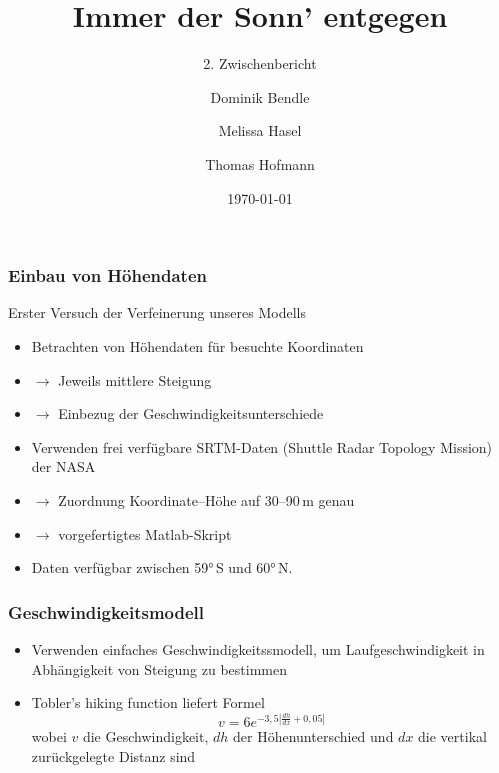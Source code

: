 \documentclass[aspectratio=43]{beamer}
\title{Immer der Sonn' entgegen}
\subtitle{2. Zwischenbericht}
\author{Dominik Bendle \and Melissa Hasel \and Thomas Hofmann}
\date{\today}
\institute{TU Kaiserslautern}
\begin{document}
\begin{frame}[plain]


\end{frame}

\begin{frame}
    \frametitle{Einbau von Höhendaten}
    Erster Versuch der Verfeinerung unseres Modells
    \begin{itemize}
        \item Betrachten von Höhendaten für besuchte Koordinaten
        \item[]$\rightarrow$ Jeweils mittlere Steigung
        \item[]$\rightarrow$ Einbezug der Geschwindigkeitsunterschiede
        \item Verwenden frei verfügbare SRTM-Daten (Shuttle Radar Topology Mission) der NASA
        \item[]$\rightarrow$ Zuordnung Koordinate--Höhe auf 30--90\,m genau
        \item[]$\rightarrow$ vorgefertigtes Matlab-Skript
        \item Daten verfügbar zwischen 59°\,S und 60°\,N.
    \end{itemize}
\end{frame}

\begin{frame}
    \frametitle{Geschwindigkeitsmodell}
    \begin{itemize}
        \item Verwenden einfaches Geschwindigkeitssmodell, um Laufgeschwindigkeit in
            Abhängigkeit von Steigung zu bestimmen
        \item Tobler's hiking function liefert Formel
            \begin{equation*}
                v = 6e^{-3{,}5 \left| \frac{d h}{d x} + 0{,}05\right|}
            \end{equation*}
            wobei $v$ die Geschwindigkeit, $dh$ der Höhenunterschied und $dx$ die
            vertikal zurückgelegte Distanz sind
    \end{itemize}
\end{frame}
\end{document}
